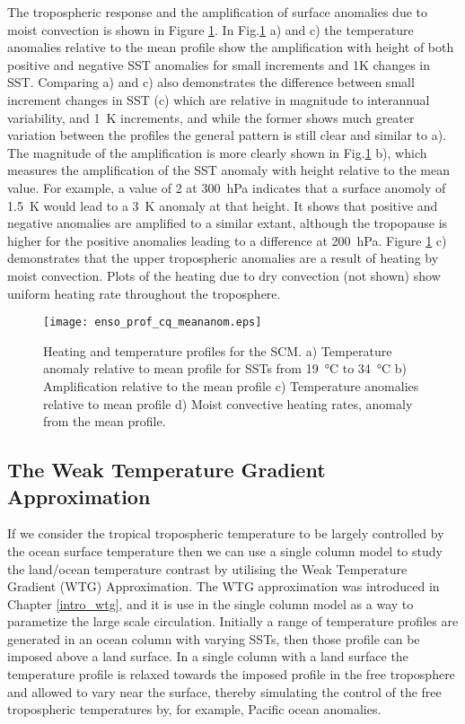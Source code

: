 The tropospheric response and the amplification of surface anomalies due to 
moist convection is shown in Figure \ref{fig:scmsstprof}.  In 
Fig.\ref{fig:scmsstprof} a) and c) the temperature anomalies relative to the 
mean profile show the amplification with height of both positive and negative 
SST anomalies for small increments and 1K changes in SST. Comparing a) and c) 
also demonstrates the difference between small increment changes in SST (c) 
which are relative in magnitude to interannual variability, and \SI{1}{\kelvin} 
increments, and while the former shows much greater variation between the 
profiles the general pattern is still clear and similar to a).  The magnitude of 
the amplification is more clearly shown in Fig.\ref{fig:scmsstprof} b), which 
measures the amplification of the SST anomaly with height relative to the mean 
value.  For example, a value of 2 at \SI{300}{\hecto\pascal} indicates that a 
surface anomoly of \SI{1.5}{\kelvin} would lead to a \SI{3}{\kelvin} anomaly at 
that height.  It shows that positive and negative anomalies are amplified to a 
similar extant, although the tropopause is higher for the positive anomalies 
leading to a difference at \SI{200}{\hecto\pascal}.  Figure \ref{fig:scmsstprof} 
c) demonstrates that the upper tropospheric anomalies are a result of heating by 
moist convection. Plots of the heating due to dry convection (not shown) show 
uniform heating rate throughout the troposphere.

\begin{figure}[ht]
\texttt{[image: enso\_prof\_cq\_meananom.eps]}
\caption{Heating and temperature profiles for the SCM. a) Temperature anomaly 
	relative to mean profile for SSTs from \SI{19}{\degreeCelsius} to 
	\SI{34}{\degreeCelsius} b) Amplification relative to the mean profile c) 
	Temperature anomalies relative to mean profile d) Moist convective heating 
rates, anomaly from the mean profile.}
\label{fig:scmsstprof}
\end{figure}

\subsection{The Weak Temperature Gradient Approximation}
If we consider the tropical tropospheric temperature to be largely controlled by 
the ocean surface temperature then we can use a single column model to study the 
land/ocean temperature contrast by utilising the Weak Temperature Gradient (WTG) 
Approximation. The WTG approximation was introduced in Chapter \ref{intro_wtg}, 
and it is use in the single column model as a way to parametize the large scale 
circulation.
Initially a range of temperature profiles are generated in an ocean column with 
varying SSTs, then those profile can be imposed above a land surface.  In a 
single column with a land surface the temperature profile is relaxed towards the 
imposed profile in the free troposphere and allowed to vary near the surface, 
thereby simulating the control of the free tropospheric temperatures by, for 
example, Pacific ocean anomalies.

